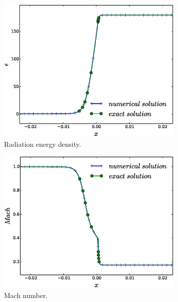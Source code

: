 \documentclass[times,doublespace]{fldauth}%
\begin{document}
\begin{figure}[h]
%
    \begin{subfigure}{0.49\textwidth}
    \includegraphics[width=\linewidth]{figures/cst-xs/mach-3/mass-diff-radiation-nel-1000-plot.eps}
    \caption{Radiation energy density.}\label{fig:mach-3-cst-xs-rad}
    \end{subfigure}
%   
    \begin{subfigure}{0.49\textwidth}
    \includegraphics[width=\linewidth]{figures/cst-xs/mach-3/mass-diff-mach-number-nel-1000-plot.eps}
    \caption{Mach number.}\label{fig:mach-3-cst-xs-mach}
    \end{subfigure}
%
    \begin{subfigure}{0.49\textwidth}

\end{subfigure}
\end{figure}
\end{document}
